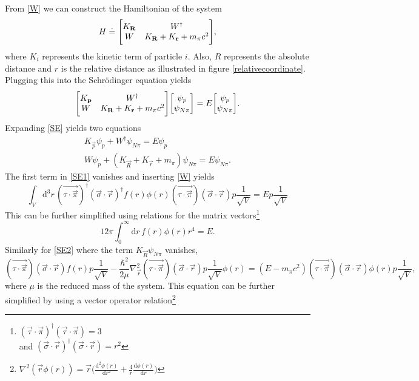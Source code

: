 From \eqref{W} we can construct the Hamiltonian of the system
\begin{equation}
    H \doteq \mqty[K_{\vec{R}} & W^\dagger \\ W & K_{\vec{R}}+K_{\vec{r}}+m_\pi c^2],
\end{equation}
where $K_i$ represents the kinetic term of particle $i$. Also, $R$ represents the absolute distance and $r$ is the relative distance as illustrated in figure \ref{relativecoordinate}. Plugging this into the Schrödinger equation yields 
\begin{equation}\label{SE}
    \mqty[K_{\vec{p}} & W^\dagger \\ W & K_{\vec{R}}+K_{\vec{r}}+m_\pi c^2]\mqty[\psi_p \\ \psi_{N\pi}] = E \mqty[\psi_p \\ \psi_{N\pi}].
\end{equation}
Expanding \eqref{SE} yields two equations
\begin{align}
    K_{\vec{p}}\psi_p + W^\dagger \psi_{N\pi} = E\psi_p \label{SE1} \\
    W\psi_p + (K_{\vec{R}}+K_{\vec{r}}+m_\pi)\psi_{N\pi} = E\psi_{N\pi} \label{SE2}.
\end{align}
The first term in \eqref{SE1} vanishes and inserting \eqref{W} yields
\begin{equation}
    \int_V \text{d}^3r \, (\vec{\tau\cdot\vec{\pi}})^\dagger(\vec{\sigma}\cdot\vec{r})^\dagger f(r)\phi(r)(\vec{\tau\cdot\vec{\pi}})(\vec{\sigma}\cdot\vec{r})p\frac{1}{\sqrt{V}} = E p\frac{1}{\sqrt{V}}
\end{equation}
This can be further simplified using relations for the matrix vectors\footnote{$(\vec{\tau}\cdot \vec{\pi})^\dagger(\vec{\tau}\cdot \vec{\pi}) = 3$ \\ and
$(\vec{\sigma}\cdot \vec{r})^\dagger(\vec{\sigma}\cdot \vec{r}) = r^2$}
\begin{equation} \label{SE11}
    12\pi \int_0^\infty  \text{d}r \, f(r) \phi(r) r^4  = E.
\end{equation}
Similarly for \eqref{SE2} where the term $K_{\vec{R}}\psi_{N\pi}$ vanishes,
\begin{equation} \label{SE22}
    (\vec{\tau\cdot\vec{\pi}})(\vec{\sigma}\cdot\vec{r})f(r) p \frac{1}{\sqrt{V}}-\frac{\hbar^2}{2\mu} \nabla^2_{\vec{r}}(\vec{\tau\cdot\vec{\pi}})(\vec{\sigma}\cdot\vec{r}) p \frac{1}{\sqrt{V}}\phi(r) = (E-m_\pi c^2) (\vec{\tau\cdot\vec{\pi}})(\vec{\sigma}\cdot\vec{r}) \phi(r)p\frac{1}{\sqrt{V}},
\end{equation}
where $\mu$ is the reduced mass of the system. This equation can be further simplified by using a vector operator relation\footnote{$\nabla^2(\vec{r}\phi(r))=\vec{r}\big(\frac{\text{d}^2\phi(r)}{\text{d}r^2}+\frac{4}{r}\frac{\text{d}\phi(r)}{\text{d}r}\big)$}
